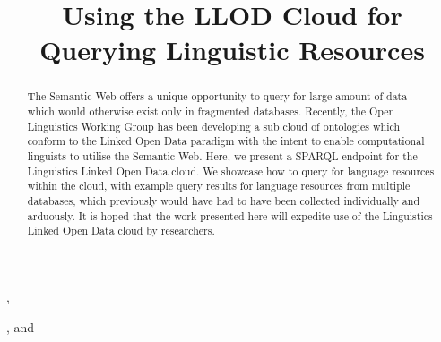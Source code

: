 \documentclass{iosart2c}
\begin{document}
\begin{frontmatter}                           %

\title{Using the LLOD Cloud for Querying Linguistic Resources%
} %



\author[A,B]{ },
\author[C]{ },
and
\author[D]{ }


\address[A]{Department of Intelligent Computer Systems, University of Malta, Msida, MSD2080, Malta}
\address[B]{Computational Linguistics Department, Saarland University, Saarbr\"ucken, 66121, Germany\\  E-mail: littauer@coli.uni-saarland.de}
\address[C]{Research Unit Quantitative Language Comparison, Ludwig Maximilian University, Geschwister Scholl Platz 1, D-80539 Munich, Germany\\ 
E-mail: bambooforest@gmail.com} %
\address[D]{Intelligent Software Components, iSOCO, S.A., Av. del Partenon 16-18, Madrid, Spain\\
E-mail: bvillazon@isoco.com}

\begin{abstract}
The Semantic Web offers a unique opportunity to query for large amount of data which would otherwise exist only in fragmented databases. Recently, the Open Linguistics Working Group has been developing a sub cloud of ontologies which conform to the Linked Open Data paradigm with the intent to enable computational linguists to utilise the Semantic Web. Here, we present a SPARQL endpoint for the Linguistics Linked Open Data cloud. We showcase how to query for language resources within the cloud, with example query results for language resources from multiple databases, which previously would have had to have been collected individually and arduously. It is hoped that the work presented here will expedite use of the Linguistics Linked Open Data cloud by researchers. 


\end{abstract}
\end{frontmatter}
\end{document}
